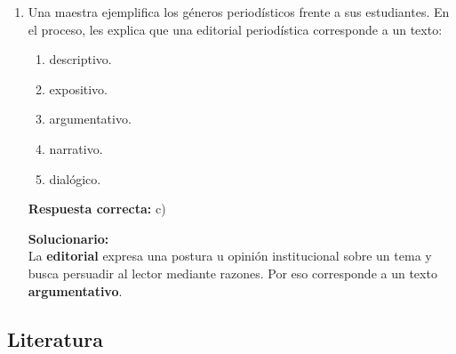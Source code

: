 \begin{enumerate}
	\vspace{2mm}
	\textbf{Solucionario:}\\
	La oración correcta es: \textit{No podrás convencerla si tú no le das seguridad; anímala porque es tu hija}.\\
	Por tanto, la secuencia es \textbf{la -- le -- la}.
	
	\vspace{6mm}
	
	\item Una maestra ejemplifica los géneros periodísticos frente a sus estudiantes. En el proceso, les explica que una editorial periodística corresponde a un texto:
	\begin{enumerate}[label=\alph*)]
		\item descriptivo.
		\item expositivo.
		\item argumentativo.
		\item narrativo.
		\item dialógico.
	\end{enumerate}
	\textbf{Respuesta correcta:} c)
	
	\vspace{2mm}
	\textbf{Solucionario:}\\
	La \textbf{editorial} expresa una postura u opinión institucional sobre un tema y busca persuadir al lector mediante razones. Por eso corresponde a un texto \textbf{argumentativo}.
	
	\vspace{6mm}
	
\end{enumerate}

\subsection*{Literatura}

